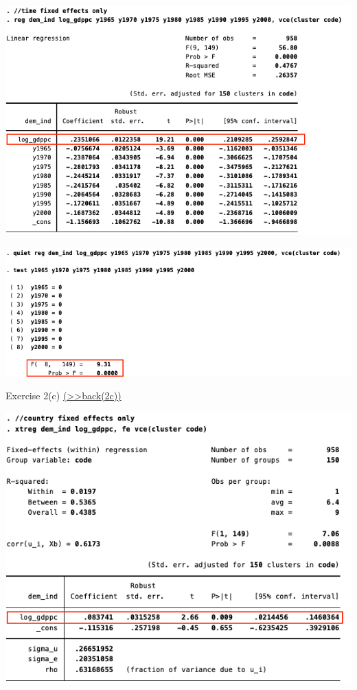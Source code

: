 \documentclass[
  10pt,
  ignorenonframetext,
]{beamer}
\begin{document}
\begin{frame}{}
\protect\hypertarget{section-2}{}
\begin{flushleft}\includegraphics[width=0.9\linewidth]{pictures/Ex2-TimeFEs} \end{flushleft}
\end{frame}

\begin{frame}{}
\protect\hypertarget{section-3}{}
\begin{flushleft}\includegraphics[width=0.9\linewidth]{pictures/Ex2-TimeFEsTest} \end{flushleft}
\end{frame}

\begin{frame}{Exercise 2(c)
\footnotesize \protect\hyperlink{Ex2-CountryFEs-A}{(\textgreater\textgreater back(2c))}
\normalsize }
\protect\hypertarget{Ex2-CountryFEs}{}
\begin{flushleft}\includegraphics[width=0.9\linewidth]{pictures/Ex2-CountryFEs} \end{flushleft}
\end{frame}
\end{document}
